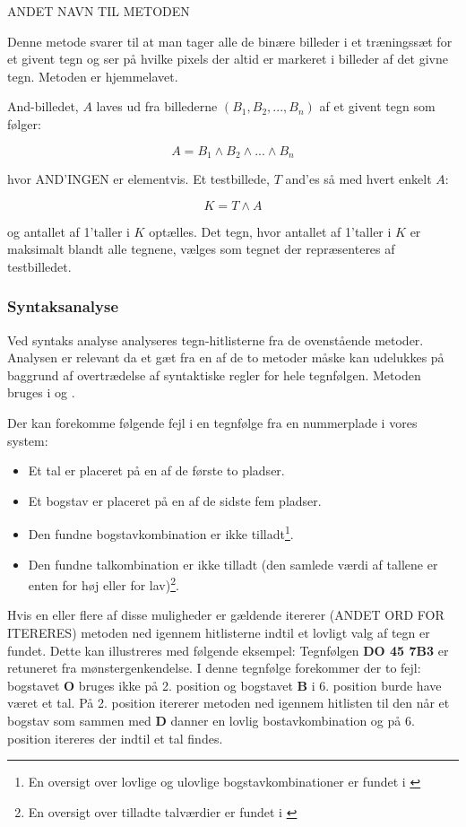 ANDET NAVN TIL METODEN

Denne metode svarer til at man tager alle de binære billeder i et træningssæt for et givent tegn og ser på hvilke pixels der altid er markeret i billeder af det givne tegn. Metoden er hjemmelavet.

And-billedet, $A$ laves ud fra billederne $(B_{1},B_{2},...,B_{n})$ af et givent tegn som følger:

\begin{displaymath}
A = B_1 \wedge B_2 \wedge ... \wedge B_n
\end{displaymath}

hvor AND'INGEN er elementvis. Et testbillede, $T$ and'es så med hvert enkelt $A$:

\begin{displaymath}
K = T \wedge A
\end{displaymath}

og antallet af 1'taller i $K$ optælles. Det tegn, hvor antallet af 1'taller i $K$ er maksimalt blandt alle tegnene, vælges som tegnet der repræsenteres af testbilledet.

\subsubsection{Syntaksanalyse}

Ved syntaks analyse analyseres tegn-hitlisterne fra de ovenstående metoder. Analysen er relevant da et gæt fra en af de to metoder måske kan udelukkes på baggrund af overtrædelse af syntaktiske regler for hele tegnfølgen. Metoden bruges i \cite{nijhuis} og \cite{kwas}.

Der kan forekomme følgende fejl i en tegnfølge fra en nummerplade i vores system:

\begin{itemize}
\item Et tal er placeret på en af de første to pladser.
\item Et bogstav er placeret på en af de sidste fem pladser.
\item Den fundne bogstavkombination er ikke tilladt\footnote{En oversigt over lovlige og ulovlige bogstavkombinationer er fundet i \cite{bogstav_komb}}.
\item Den fundne talkombination er ikke tilladt (den samlede værdi af tallene er enten for høj eller for lav)\footnote{En oversigt over tilladte talværdier er fundet i \cite{nrpl}}.
\end{itemize}

Hvis en eller flere af disse muligheder er gældende itererer (ANDET ORD FOR ITERERES) metoden ned igennem hitlisterne indtil et lovligt valg af tegn er fundet. Dette kan illustreres med følgende eksempel: Tegnfølgen \textbf{DO 45 7B3} er retuneret fra mønstergenkendelse. I denne tegnfølge forekommer der to fejl: bogstavet \textbf{O} bruges ikke på 2. position og bogstavet \textbf{B} i 6. position burde have været et tal. På 2. position itererer metoden ned igennem hitlisten til den når et bogstav som sammen med \textbf{D} danner en lovlig bostavkombination og på 6. position itereres der indtil et tal findes.


